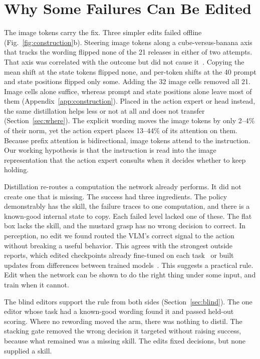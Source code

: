 \documentclass{article}
\begin{document}
\section{Why Some Failures Can Be Edited}
\label{sec:why}
The image tokens carry the fix. Three simpler edits failed offline (Fig.~\ref{fig:construction}b). Steering image tokens along a cube-versus-banana axis that tracks the wording flipped none of the 21 releases in either of two attempts. That axis was correlated with the outcome but did not cause it~\citep{turner2023steering}. Copying the mean shift at the state tokens flipped none, and per-token shifts at the 40 prompt and state positions flipped only some. Adding the 32 image cells removed all 21. Image cells alone suffice, whereas prompt and state positions alone leave most of them (Appendix~\ref{app:construction}). Placed in the action expert or head instead, the same distillation helps less or not at all and does not transfer (Section~\ref{sec:where}). The explicit wording moves the image tokens by only 2--4\% of their norm, yet the action expert places 13--44\% of its attention on them. Because prefix attention is bidirectional, image tokens attend to the instruction. Our working hypothesis is that the instruction is read into the image representation that the action expert consults when it decides whether to keep holding.

Distillation re-routes a computation the network already performs. It did not create one that is missing. The success had three ingredients. The policy demonstrably has the skill, the failure traces to one computation, and there is a known-good internal state to copy. Each failed level lacked one of these. The flat box lacks the skill, and the mustard grasp has no wrong decision to correct. In perception, no edit we found routed the VLM's correct signal to the action without breaking a useful behavior. This agrees with the strongest outside reports, which edited checkpoints already fine-tuned on each task~\citep{guo2026robotweights} or built updates from differences between trained models~\citep{gupta2026robotweights,ilharco2023arithmetic}. This suggests a practical rule. Edit when the network can be shown to do the right thing under some input, and train when it cannot.

The blind editors support the rule from both sides (Section~\ref{sec:blind}). The one editor whose task had a known-good wording found it and passed held-out scoring. Where no rewording moved the arm, there was nothing to distil. The stacking gate removed the wrong decision it targeted without raising success, because what remained was a missing skill. The edits fixed decisions, but none supplied a skill.
\end{document}
